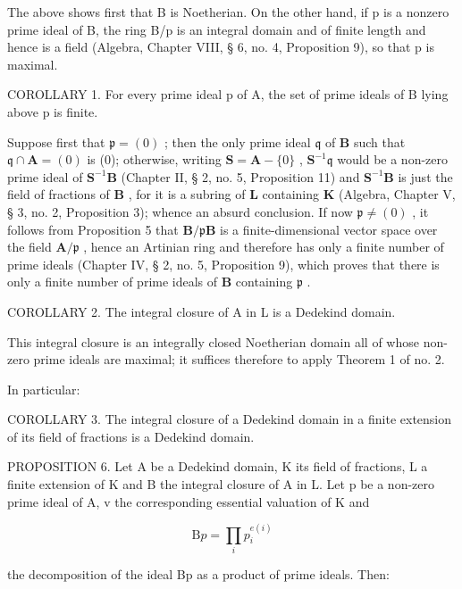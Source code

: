 The above shows first that B is Noetherian. On the other hand, if p is a nonzero prime ideal of B, the ring B/p is an integral domain and of finite length and hence is a field (Algebra, Chapter VIII, § 6, no. 4, Proposition 9), so that p is maximal.

COROLLARY 1. For every prime ideal p of A, the set of prime ideals of B lying above p is finite.

Suppose first that \(\mathfrak{p} = (0)\) ; then the only prime ideal \(\mathfrak{q}\) of \(\mathbf{B}\) such that \(\mathfrak{q} \cap \mathbf{A} = (0)\) is (0); otherwise, writing \(\mathbf{S} = \mathbf{A} - \{0\}\) , \(\mathbf{S}^{-1}\mathfrak{q}\) would be a non-zero prime ideal of \(\mathbf{S}^{-1}\mathbf{B}\) (Chapter II, § 2, no. 5, Proposition 11) and \(\mathbf{S}^{-1}\mathbf{B}\) is just the field of fractions of \(\mathbf{B}\) , for it is a subring of \(\mathbf{L}\) containing \(\mathbf{K}\) (Algebra, Chapter V, § 3, no. 2, Proposition 3); whence an absurd conclusion. If now \(\mathfrak{p} \neq (0)\) , it follows from Proposition 5 that \(\mathbf{B}/\mathfrak{p}\mathbf{B}\) is a finite-dimensional vector space over the field \(\mathbf{A}/\mathfrak{p}\) , hence an Artinian ring and therefore has only a finite number of prime ideals (Chapter IV, § 2, no. 5, Proposition 9), which proves that there is only a finite number of prime ideals of \(\mathbf{B}\) containing \(\mathfrak{p}\) .

COROLLARY 2. The integral closure of A in L is a Dedekind domain.

This integral closure is an integrally closed Noetherian domain all of whose non-zero prime ideals are maximal; it suffices therefore to apply Theorem 1 of no. 2.

In particular:

COROLLARY 3. The integral closure of a Dedekind domain in a finite extension of its field of fractions is a Dedekind domain.

PROPOSITION 6. Let A be a Dedekind domain, K its field of fractions, L a finite extension of K and B the integral closure of A in L. Let p be a non-zero prime ideal of A, v the corresponding essential valuation of K and

\[
\mathrm{B} p = \prod_ {i} p _ {i} ^ {e (i)}
\]

the decomposition of the ideal Bp as a product of prime ideals. Then:

